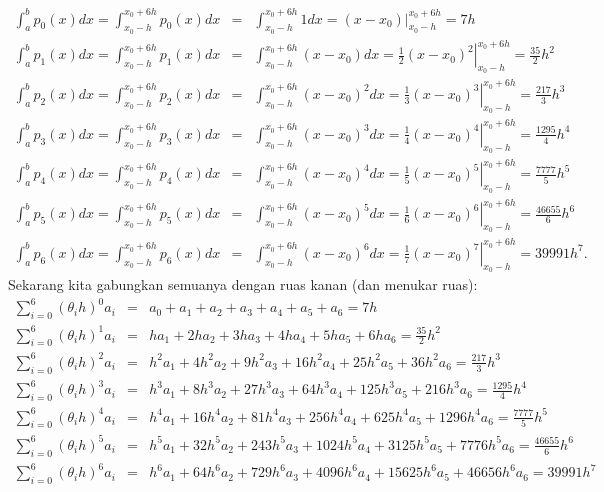 \begin{eqnarray*}
\int_{a}^{b}p_{0}(x)dx=\int_{x_{0}-h}^{x_{0}+6h}p_{0}(x)dx & = & \int_{x_{0}-h}^{x_{0}+6h}1dx=\left.(x-x_{0})\right|_{x_{0}-h}^{x_{0}+6h}=7h\\
\int_{a}^{b}p_{1}(x)dx=\int_{x_{0}-h}^{x_{0}+6h}p_{1}(x)dx & = & \int_{x_{0}-h}^{x_{0}+6h}(x-x_{0})dx=\left.\frac{1}{2}(x-x_{0})^{2}\right|_{x_{0}-h}^{x_{0}+6h}=\frac{35}{2}h^{2}\\
\int_{a}^{b}p_{2}(x)dx=\int_{x_{0}-h}^{x_{0}+6h}p_{2}(x)dx & = & \int_{x_{0}-h}^{x_{0}+6h}(x-x_{0})^{2}dx=\left.\frac{1}{3}(x-x_{0})^{3}\right|_{x_{0}-h}^{x_{0}+6h}=\frac{217}{3}h^{3}\\
\int_{a}^{b}p_{3}(x)dx=\int_{x_{0}-h}^{x_{0}+6h}p_{3}(x)dx & = & \int_{x_{0}-h}^{x_{0}+6h}(x-x_{0})^{3}dx=\left.\frac{1}{4}(x-x_{0})^{4}\right|_{x_{0}-h}^{x_{0}+6h}=\frac{1295}{4}h^{4}\\
\int_{a}^{b}p_{4}(x)dx=\int_{x_{0}-h}^{x_{0}+6h}p_{4}(x)dx & = & \int_{x_{0}-h}^{x_{0}+6h}(x-x_{0})^{4}dx=\left.\frac{1}{5}(x-x_{0})^{5}\right|_{x_{0}-h}^{x_{0}+6h}=\frac{7777}{5}h^{5}\\
\int_{a}^{b}p_{5}(x)dx=\int_{x_{0}-h}^{x_{0}+6h}p_{5}(x)dx & = & \int_{x_{0}-h}^{x_{0}+6h}(x-x_{0})^{5}dx=\left.\frac{1}{6}(x-x_{0})^{6}\right|_{x_{0}-h}^{x_{0}+6h}=\frac{46655}{6}h^{6}\\
\int_{a}^{b}p_{6}(x)dx=\int_{x_{0}-h}^{x_{0}+6h}p_{6}(x)dx & = & \int_{x_{0}-h}^{x_{0}+6h}(x-x_{0})^{6}dx=\left.\frac{1}{7}(x-x_{0})^{7}\right|_{x_{0}-h}^{x_{0}+6h}=39991h^{7}.
\end{eqnarray*}
Sekarang kita gabungkan semuanya dengan ruas kanan (dan menukar ruas):
\begin{eqnarray*}
\sum_{i=0}^{6}(\theta_{i}h)^{0}a_{i} & = & a_{0}+a_{1}+a_{2}+a_{3}+a_{4}+a_{5}+a_{6}=7h\\
\sum_{i=0}^{6}(\theta_{i}h)^{1}a_{i} & = & ha_{1}+2ha_{2}+3ha_{3}+4ha_{4}+5ha_{5}+6ha_{6}=\frac{35}{2}h^{2}\\
\sum_{i=0}^{6}(\theta_{i}h)^{2}a_{i} & = & h^{2}a_{1}+4h^{2}a_{2}+9h^{2}a_{3}+16h^{2}a_{4}+25h^{2}a_{5}+36h^{2}a_{6}=\frac{217}{3}h^{3}\\
\sum_{i=0}^{6}(\theta_{i}h)^{3}a_{i} & = & h^{3}a_{1}+8h^{3}a_{2}+27h^{3}a_{3}+64h^{3}a_{4}+125h^{3}a_{5}+216h^{3}a_{6}=\frac{1295}{4}h^{4}\\
\sum_{i=0}^{6}(\theta_{i}h)^{4}a_{i} & = & h^{4}a_{1}+16h^{4}a_{2}+81h^{4}a_{3}+256h^{4}a_{4}+625h^{4}a_{5}+1296h^{4}a_{6}=\frac{7777}{5}h^{5}\\
\sum_{i=0}^{6}(\theta_{i}h)^{5}a_{i} & = & h^{5}a_{1}+32h^{5}a_{2}+243h^{5}a_{3}+1024h^{5}a_{4}+3125h^{5}a_{5}+7776h^{5}a_{6}=\frac{46655}{6}h^{6}\\
\sum_{i=0}^{6}(\theta_{i}h)^{6}a_{i} & = & h^{6}a_{1}+64h^{6}a_{2}+729h^{6}a_{3}+4096h^{6}a_{4}+15625h^{6}a_{5}+46656h^{6}a_{6}=39991h^{7}
\end{eqnarray*}
